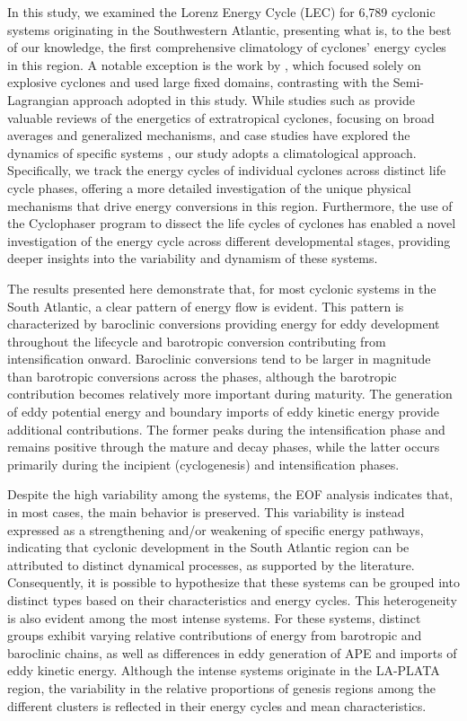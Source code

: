 \documentclass[pdflatex,sn-chicago]{sn-jnl}%
\theoremstyle{plain}
\theoremstyle{definition}
\theoremstyle{remark}
\theoremstyle{definition}
\begin{document}
In this study, we examined the Lorenz Energy Cycle (LEC) for 6,789 cyclonic systems originating in the Southwestern Atlantic, presenting what is, to the best of our knowledge, the first comprehensive climatology of cyclones' energy cycles in this region. A notable exception is the work by \citet{black2013universal}, which focused solely on explosive cyclones and used large fixed domains, contrasting with the Semi-Lagrangian approach adopted in this study. While studies such as \citet{smith1980energetics} provide valuable reviews of the energetics of extratropical cyclones, focusing on broad averages and generalized mechanisms, and case studies have explored the dynamics of specific systems \citep[e.g.]{pezza2014large,dias2011energy,cavicchia2018energetics}, our study adopts a climatological approach. Specifically, we track the energy cycles of individual cyclones across distinct life cycle phases, offering a more detailed investigation of the unique physical mechanisms that drive energy conversions in this region. Furthermore, the use of the Cyclophaser program to dissect the life cycles of cyclones has enabled a novel investigation of the energy cycle across different developmental stages, providing deeper insights into the variability and dynamism of these systems.

The results presented here demonstrate that, for most cyclonic systems in the South Atlantic, a clear pattern of energy flow is evident. This pattern is characterized by baroclinic conversions providing energy for eddy development throughout the lifecycle and barotropic conversion contributing from intensification onward. Baroclinic conversions tend to be larger in magnitude than barotropic conversions across the phases, although the barotropic contribution becomes relatively more important during maturity. The generation of eddy potential energy and boundary imports of eddy kinetic energy provide additional contributions. The former peaks during the intensification phase and remains positive through the mature and decay phases, while the latter occurs primarily during the incipient (cyclogenesis) and intensification phases.

Despite the high variability among the systems, the EOF analysis indicates that, in most cases, the main behavior is preserved. This variability is instead expressed as a strengthening and/or weakening of specific energy pathways, indicating that cyclonic development in the South Atlantic region can be attributed to distinct dynamical processes, as supported by the literature. Consequently, it is possible to hypothesize that these systems can be grouped into distinct types based on their characteristics and energy cycles. This heterogeneity is also evident among the most intense systems. For these systems, distinct groups exhibit varying relative contributions of energy from barotropic and baroclinic chains, as well as differences in eddy generation of APE and imports of eddy kinetic energy. Although the intense systems originate in the LA-PLATA region, the variability in the relative proportions of genesis regions among the different clusters is reflected in their energy cycles and mean characteristics.
\end{document}
